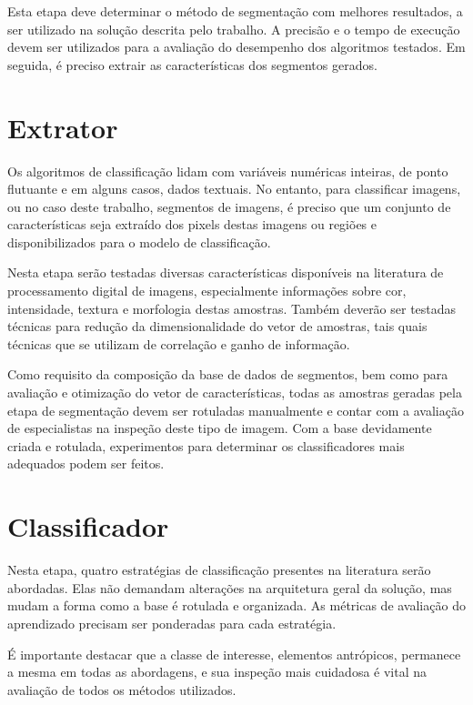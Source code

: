 Esta etapa deve determinar o método de segmentação com melhores resultados, a ser utilizado na solução descrita pelo trabalho. A precisão e o tempo de execução devem ser utilizados para a avaliação do desempenho dos algoritmos testados. Em seguida, é preciso extrair as características dos segmentos gerados.

\section{Extrator}\label{sec:metExtrator}

Os algoritmos de classificação lidam com variáveis numéricas inteiras, de ponto flutuante e em alguns casos, dados textuais. No entanto, para classificar imagens, ou no caso deste trabalho, segmentos de imagens, é preciso que um conjunto de características seja extraído dos pixels destas imagens ou regiões e disponibilizados para o modelo de classificação.

Nesta etapa serão testadas diversas características disponíveis na literatura de processamento digital de imagens, especialmente informações sobre cor, intensidade, textura e morfologia destas amostras. Também deverão ser testadas técnicas para redução da dimensionalidade do vetor de amostras, tais quais técnicas que se utilizam de correlação e ganho de informação.

Como requisito da composição da base de dados de segmentos, bem como para avaliação e otimização do vetor de características, todas as amostras geradas pela etapa de segmentação devem ser rotuladas manualmente e contar com a avaliação de especialistas na inspeção deste tipo de imagem. Com a base devidamente criada e rotulada, experimentos para determinar os classificadores mais adequados podem ser feitos.

\section{Classificador}\label{sec:metClassificador}

Nesta etapa, quatro estratégias de classificação presentes na literatura serão abordadas. Elas não demandam alterações na arquitetura geral da solução, mas mudam a forma como a base é rotulada e organizada. As métricas de avaliação do aprendizado precisam ser ponderadas para cada estratégia.

É importante destacar que a classe de interesse, elementos antrópicos, permanece a mesma em todas as abordagens, e sua inspeção mais cuidadosa é vital na avaliação de todos os métodos utilizados.

